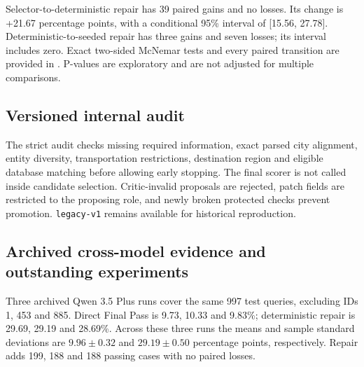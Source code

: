 \documentclass{article}
\begin{document}
\begin{table}[h]
\centering
\caption{Paired changes on the 180 frozen validation instances. Intervals use
20,000 paired bootstrap resamples with seed 20260904. They describe these frozen
predictions, not variability across new model generations. Component contrasts
are exploratory and do not isolate causal effects.}
\resizebox{\linewidth}{!}{}
\end{table}

Selector-to-deterministic repair has 39 paired gains and no losses. Its change is
+21.67 percentage points, with a conditional 95\% interval of [15.56, 27.78].
Deterministic-to-seeded repair has three gains and seven losses; its interval
includes zero. Exact two-sided McNemar tests and every paired transition are
provided in . P-values are exploratory and
are not adjusted for multiple comparisons.

\subsection{Versioned internal audit}
The strict audit checks missing required information, exact parsed city alignment,
entity diversity, transportation restrictions, destination region and eligible
database matching before allowing early stopping. The final scorer is not called
inside candidate selection. Critic-invalid proposals are rejected, patch fields
are restricted to the proposing role, and newly broken protected checks prevent
promotion. \texttt{legacy-v1} remains available for historical reproduction.

\begin{table}[h]
\centering
\caption{Internal-audit calibration against frozen Final Pass labels. FP means
an audit-passed plan fails final scoring; FN means an audit-rejected plan passes.
The strict audit was developed using this validation split, so this table is a
development diagnostic rather than a held-out generalization result.}
\resizebox{0.9\linewidth}{!}{}
\end{table}

\subsection{Archived cross-model evidence and outstanding experiments}
Three archived Qwen 3.5 Plus runs cover the same 997 test queries, excluding IDs 1,
453 and 885. Direct Final Pass is 9.73, 10.33 and 9.83\%; deterministic repair is
29.69, 29.19 and 28.69\%. Across these three runs the means and sample standard
deviations are $9.96\pm0.32$ and $29.19\pm0.50$ percentage points, respectively.
Repair adds 199, 188 and 188 passing cases with no paired losses.
\end{document}
